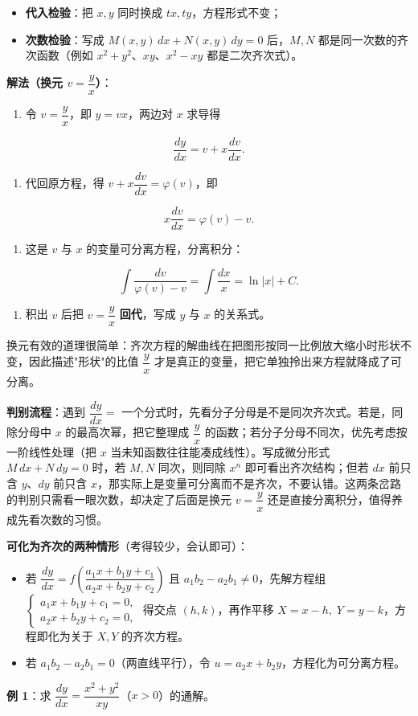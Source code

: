 \documentclass[11pt,openany,UTF8]{ctexbook}
\begin{document}
\begin{itemize}
\item \textbf{代入检验}：把 $x,y$ 同时换成 $tx,ty$，方程形式不变；
\item \textbf{次数检验}：写成 $M(x,y)\,dx+N(x,y)\,dy=0$ 后，$M,N$ 都是同一次数的齐次函数（例如 $x^{2}+y^{2}$、$xy$、$x^{2}-xy$ 都是二次齐次式）。
\end{itemize}
\textbf{解法（换元 $v=\dfrac{y}{x}$）}：

\begin{enumerate}
\item 令 $v=\dfrac{y}{x}$，即 $y=vx$，两边对 $x$ 求导得
\end{enumerate}
\[\frac{dy}{dx}=v+x\frac{dv}{dx}.\]

\begin{enumerate}
\item 代回原方程，得 $v+x\dfrac{dv}{dx}=\varphi(v)$，即
\end{enumerate}
\[x\frac{dv}{dx}=\varphi(v)-v .\]

\begin{enumerate}
\item 这是 $v$ 与 $x$ 的变量可分离方程，分离积分：
\end{enumerate}
\[\int \frac{dv}{\varphi(v)-v}=\int \frac{dx}{x}=\ln\vert x\vert+C .\]

\begin{enumerate}
\item 积出 $v$ 后把 $v=\dfrac{y}{x}$ \textbf{回代}，写成 $y$ 与 $x$ 的关系式。
\end{enumerate}
换元有效的道理很简单：齐次方程的解曲线在把图形按同一比例放大缩小时形状不变，因此描述"形状"的比值 $\dfrac yx$ 才是真正的变量，把它单独拎出来方程就降成了可分离。

\textbf{判别流程}：遇到 $\dfrac{dy}{dx}=$ 一个分式时，先看分子分母是不是同次齐次式。若是，同除分母中 $x$ 的最高次幂，把它整理成 $\dfrac yx$ 的函数；若分子分母不同次，优先考虑按一阶线性处理（把 $x$ 当未知函数往往能凑成线性）。写成微分形式 $M\,dx+N\,dy=0$ 时，若 $M,N$ 同次，则同除 $x^{n}$ 即可看出齐次结构；但若 $dx$ 前只含 $y$、$dy$ 前只含 $x$，那实际上是变量可分离而不是齐次，不要认错。这两条岔路的判别只需看一眼次数，却决定了后面是换元 $v=\dfrac yx$ 还是直接分离积分，值得养成先看次数的习惯。

\textbf{可化为齐次的两种情形}（考得较少，会认即可）：

\begin{itemize}
\item 若 $\dfrac{dy}{dx}=f\!\left(\dfrac{a_1x+b_1y+c_1}{a_2x+b_2y+c_2}\right)$ 且 $a_1b_2-a_2b_1\ne 0$，先解方程组 $\begin{cases}a_1x+b_1y+c_1=0,\\ a_2x+b_2y+c_2=0,\end{cases}$ 得交点 $(h,k)$，再作平移 $X=x-h,\;Y=y-k$，方程即化为关于 $X,Y$ 的齐次方程。
\item 若 $a_1b_2-a_2b_1=0$（两直线平行），令 $u=a_2x+b_2y$，方程化为可分离方程。
\end{itemize}
\textbf{例 1}：求 $\dfrac{dy}{dx}=\dfrac{x^{2}+y^{2}}{xy}$（$x>0$）的通解。
\end{document}
